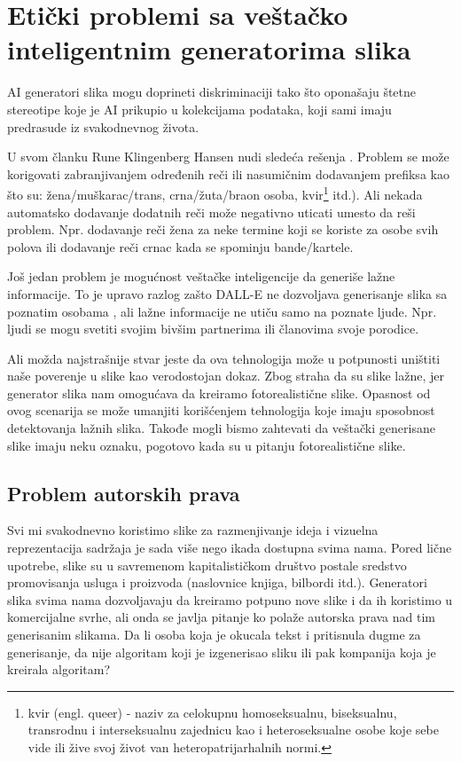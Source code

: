 \documentclass[12pt, letterpaper]{article}
\begin{document}
\pagebreak

\section{Etički problemi sa veštačko inteligentnim generatorima slika}

AI generatori slika mogu doprineti diskriminaciji tako što oponašaju štetne stereotipe koje je AI prikupio u kolekcijama podataka, koji sami imaju predrasude iz svakodnevnog života.

U svom članku Rune Klingenberg Hansen nudi sledeća rešenja \cite{kljuc1}. Problem se može korigovati zabranjivanjem određenih reči ili nasumičnim dodavanjem prefiksa kao što su: žena/muškarac/trans, crna/žuta/braon osoba, kvir\footnote{kvir (engl. queer) - naziv za celokupnu homoseksualnu, biseksualnu, transrodnu i interseksualnu zajednicu kao i heteroseksualne osobe koje sebe vide ili žive svoj život van heteropatrijarhalnih normi.} itd.). Ali nekada automatsko dodavanje dodatnih reči može negativno uticati umesto da reši problem. Npr. dodavanje reči žena za neke termine koji se koriste za osobe svih polova ili dodavanje reči crnac kada se spominju bande/kartele.

Još jedan problem je mogućnost veštačke inteligencije da generiše lažne informacije. To je upravo razlog zašto DALL-E \cite{dalle} ne dozvoljava generisanje slika sa poznatim osobama \cite{poznate}, ali lažne informacije ne utiču samo na poznate ljude. Npr. ljudi se mogu svetiti svojim bivšim partnerima ili članovima svoje porodice.

Ali možda najstrašnije stvar jeste da ova tehnologija može u potpunosti uništiti naše poverenje u slike kao verodostojan dokaz. Zbog straha da su slike lažne, jer generator slika nam omogućava da kreiramo fotorealistične slike. Opasnost od ovog scenarija se može umanjiti korišćenjem tehnologija koje imaju sposobnost detektovanja lažnih slika. Takođe mogli bismo zahtevati da veštački generisane slike imaju neku oznaku, pogotovo kada su u pitanju fotorealistične slike.



\subsection{Problem autorskih prava}

Svi mi svakodnevno koristimo slike za razmenjivanje ideja i vizuelna reprezentacija sadržaja je sada više nego ikada dostupna svima nama. Pored lične upotrebe, slike su u savremenom kapitalističkom društvo postale sredstvo promovisanja usluga i proizvoda (naslovnice knjiga, bilbordi itd.). Generatori slika svima nama dozvoljavaju da kreiramo potpuno nove slike i da ih koristimo u komercijalne svrhe, ali onda se javlja pitanje ko polaže autorska prava nad tim generisanim slikama. Da li osoba koja je okucala tekst i pritisnula dugme za generisanje, da nije algoritam koji je izgenerisao sliku ili pak kompanija koja je kreirala algoritam?
\end{document}
